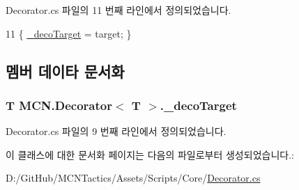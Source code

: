 Decorator.\+cs 파일의 11 번째 라인에서 정의되었습니다.


\begin{DoxyCode}
11 \{ \hyperlink{class_m_c_n_1_1_decorator_a358dba6e4ac8d5ef06ed9f5592f8827e}{\_decoTarget} = target; \}
\end{DoxyCode}


\subsection{멤버 데이타 문서화}
\subsubsection[{\texorpdfstring{\+\_\+deco\+Target}{_decoTarget}}]{\setlength{\rightskip}{0pt plus 5cm}T {\bf M\+C\+N.\+Decorator}$<$ T $>$.\+\_\+deco\+Target\hspace{0.3cm}{\ttfamily [protected]}}\hypertarget{class_m_c_n_1_1_decorator_a358dba6e4ac8d5ef06ed9f5592f8827e}{}\label{class_m_c_n_1_1_decorator_a358dba6e4ac8d5ef06ed9f5592f8827e}


Decorator.\+cs 파일의 9 번째 라인에서 정의되었습니다.



이 클래스에 대한 문서화 페이지는 다음의 파일로부터 생성되었습니다.\+:\begin{DoxyCompactItemize}
\item 
D\+:/\+Git\+Hub/\+M\+C\+N\+Tactics/\+Assets/\+Scripts/\+Core/\hyperlink{_decorator_8cs}{Decorator.\+cs}\end{DoxyCompactItemize}

